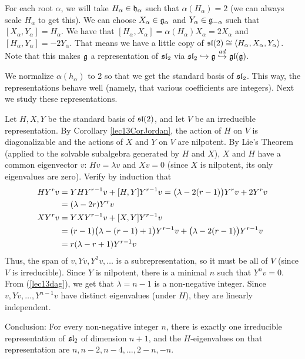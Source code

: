  For each root $\alpha$, we will take $H_\alpha\in \h_\alpha$ such that
 $\alpha(H_\alpha)=2$ (we can always scale $H_\alpha$ to get this). We can choose
 $X_\alpha\in \g_\alpha$ and $Y_\alpha\in \g_{-\alpha}$ such that
 $[X_\alpha,Y_\alpha]=H_\alpha$. We have that
 $[H_\alpha,X_\alpha]=\alpha(H_\alpha)X_\alpha=2X_\alpha$ and $[H_\alpha,Y_\alpha] =
 -2Y_\alpha$. That means we have a little copy of $\sl(2)\cong\langle
 H_\alpha,X_\alpha,Y_\alpha \rangle$. Note that this makes $\g$ a
 representation of $\sl_2$ via $\sl_2\hookrightarrow \g\stackrel{ad}{\hookrightarrow}
 \gl(\g)$.

 We normalize $\alpha(h_\alpha)$ to 2 so that we get the standard basis of $\sl_2$.
 This way, the representations behave well (namely, that various
 coefficients are integers). Next we study these representations.

  Let $H,X,Y$ be the standard basis of $\sl(2)$, and
 let $V$ be an irreducible representation. By Corollary \ref{lec13CorJordan}, the
 action of $H$ on $V$ is diagonalizable and the actions of $X$ and $Y$ on $V$ are
 nilpotent. By Lie's Theorem (applied to the solvable subalgebra generated by $H$ and
 $X$), $X$ and $H$ have a common eigenvector $v$: $Hv=\lambda v$ and $Xv=0$ (since $X$
 is nilpotent, its only eigenvalues are zero). Verify by induction that
 \begin{align}
   HY^r v &= YHY^{r-1}v + [H,Y]Y^{r-1}v = \bigl(\lambda-2(r-1)\bigr)Y^r v + 2Y^r v \notag\\
          &= (\lambda-2r)Y^rv \\
   XY^r v &= YXY^{r-1}v + [X,Y]Y^{r-1}v \notag\\
          &= (r-1)\bigl(\lambda-(r-1)+1\bigr)Y^{r-1}v + \bigl(\lambda-2(r-1) \bigr)Y^{r-1}v\notag\\
          &= r(\lambda-r+1)Y^{r-1}v \label{lec13dag}
 \end{align}
 Thus, the span of $v,Yv,Y^2v,\dots$ is a subrepresentation, so it must be all of $V$
 (since $V$ is irreducible). Since $Y$ is nilpotent, there is a minimal $n$ such that
 $Y^nv=0$. From (\ref{lec13dag}), we get that $\lambda=n-1$ is a non-negative integer.
 Since $v,Yv,\dots, Y^{n-1}v$ have distinct eigenvalues (under $H$), they are linearly
 independent.

 Conclusion: For every non-negative integer $n$, there is exactly one irreducible
 representation of $\sl_2$ of dimension $n+1$, and the $H$-eigenvalues on that
 representation are $n, n-2, n-4, \dots, 2-n,-n$.

